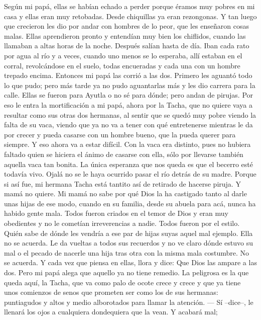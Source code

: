 \pend
%
\pstart
	Según mi papá, ellas se habían echado a perder porque éramos muy pobres en mi casa y ellas eran muy retobadas. Desde chiquillas ya eran rezongonas. Y tan luego que crecieron les dio por andar con hombres de lo peor, que les enseñaron cosas malas. Ellas aprendieron pronto y entendían muy bien los chiflidos, cuando las llamaban a altas horas de la noche. Después salían hasta de día. Iban cada rato por agua al río y a veces, cuando uno menos se lo esperaba, allí estaban en el corral, revolcándose en el suelo, todas encueradas y cada una con un hombre trepado encima.
\pend
%
\pstart
	Entonces mi papá las corrió a las dos. Primero les aguantó todo lo que pudo; pero más tarde ya no pudo aguantarlas más y les dio carrera para la calle. Ellas se fueron para Ayutla o no sé para dónde; pero andan de pirujas.
\pend
%
\pstart
	Por eso le entra la mortificación a mi papá, ahora por la Tacha, que no quiere vaya a resultar como sus otras dos hermanas, al sentir que se quedó muy pobre viendo la falta de su vaca, viendo que ya no va a tener con qué entretenerse mientras le da por crecer y pueda casarse con un hombre bueno, que la pueda querer para siempre. Y eso ahora va a estar difícil. Con la vaca era distinto, pues no hubiera faltado quien se hiciera el ánimo de casarse con ella, sólo por llevarse también aquella vaca tan bonita.
\pend
%
\pstart
	La única esperanza que nos queda es que el becerro esté todavía vivo. Ojalá no se le haya ocurrido pasar el río detrás de su madre. Porque si así fue, mi hermana Tacha está tantito así de retirado de hacerse piruja. Y mamá no quiere.
\pend
%
\pstart
	Mi mamá no sabe por qué Dios la ha castigado tanto al darle unas hijas de ese modo, cuando en su familia, desde su abuela para acá, nunca ha habido gente mala. Todos fueron criados en el temor de Dios y eran muy obedientes y no le cometían irreverencias a nadie. Todos fueron por el estilo. Quién sabe de dónde les vendría a ese par de hijas suyas aquel mal ejemplo. Ella no se acuerda. Le da vueltas a todos sus recuerdos y no ve claro dónde estuvo su mal o el pecado de nacerle una hija tras otra con la misma mala costumbre. No se acuerda. Y cada vez que piensa en ellas, llora y dice: \og{}Que Dios las ampare a las dos.\fg{}
\pend
%
\pstart
	Pero mi papá alega que aquello ya no tiene remedio. La peligrosa es la que queda aquí, la Tacha, que va como palo de ocote crece y crece y que ya tiene unos comienzos de senos que prometen ser como los de sus hermanas: puntiagudos y altos y medio alborotados para llamar la atención.
\pend
%
\pstart
	--- Sí --dice--, le llenará los ojos a cualquiera dondequiera que la vean. Y acabará mal;
